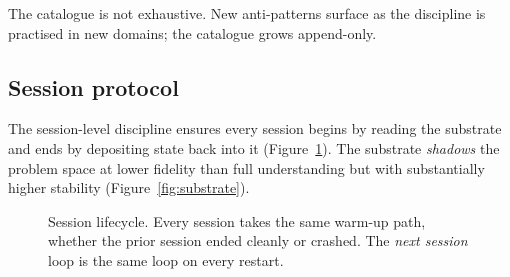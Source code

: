 \documentclass[11pt,a4paper,twocolumn]{article}
\begin{document}
The catalogue is not exhaustive. New anti-patterns surface as the
discipline is practised in new domains; the catalogue grows
append-only.

\subsection{Session protocol}

The session-level discipline ensures every session begins by
reading the substrate and ends by depositing state back into it
(Figure~\ref{fig:session}). The substrate \emph{shadows} the problem
space at lower fidelity than full understanding but with
substantially higher stability (Figure~\ref{fig:substrate}).

\begin{figure}[t]
\centering
{}
\caption{Session lifecycle. Every session takes the same warm-up
path, whether the prior session ended cleanly or crashed. The
\emph{next session} loop is the same loop on every restart.}
\label{fig:session}
\end{figure}
\end{document}
